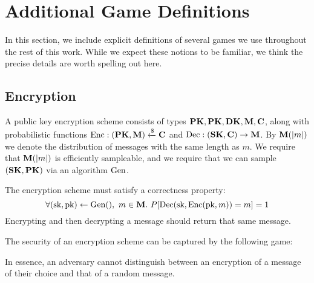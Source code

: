 \section{Additional Game Definitions}

In this section, we include explicit definitions of several games we
use throughout the rest of this work.
While we expect these notions to be familiar, we think the precise
details are worth spelling out here.

\subsection{Encryption}
\label{app:encryption}
A public key encryption scheme consists of types $\textbf{PK}, \textbf{PK}, \textbf{DK}, \textbf{M}, \textbf{C}$,
along with probabilistic functions $\text{Enc} : (\textbf{PK}, \textbf{M}) \xleftarrow{\$} \textbf{C}$ and $\text{Dec} : (\textbf{SK}, \textbf{C}) \to \textbf{M}$.
By $\textbf{M}(|m|)$ we denote the distribution of messages with the same
length as $m$.
We require that $\textbf{M}(|m|)$ is efficiently sampleable,
and we require that we can sample $(\textbf{SK}, \textbf{PK})$ via an algorithm
$\text{Gen}$.

The encryption scheme must satisfy a correctness property:
$$
\forall (\text{sk}, \text{pk}) \gets \text{Gen}(),\ m \in \textbf{M}.\ P[\text{Dec}(\text{sk}, \text{Enc}(\text{pk}, m)) = m] = 1
$$
Encrypting and then decrypting a message should return that same message.

The security of an encryption scheme can be captured by the following game:

In essence, an adversary cannot distinguish between an encryption of a message
of their choice and that of a random message.